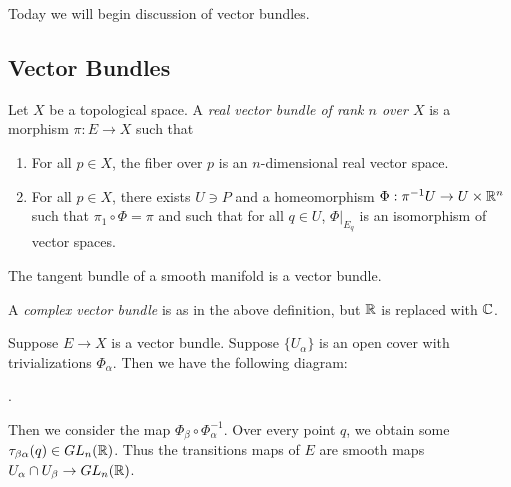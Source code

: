 \documentclass[twoside, 10pt]{article}
\begin{document}
    Today we will begin discussion of vector bundles.

    \subsection{Vector Bundles}%
    
    \begin{defn} Let $X$ be a topological space. A \textit{real vector bundle
        of rank $n$ over $X$} is a morphism $\pi:E \to X$ such that
        \begin{enumerate} \item For all $p \in X$, the fiber over $p$ is an
            $n$-dimensional real vector space.  \item For all $p \in X$, there
            exists $U \ni P$ and a homeomorphism $\Phi:\pi^{-1}U \to U \times
            \mathbb{R}^n$ such that $\pi_1 \circ \Phi = \pi$ and such that for all $q
            \in U$, $\Phi|_{E_q}$ is an isomorphism of vector spaces.
    \end{enumerate} \end{defn}

    \begin{exm} The tangent bundle of a smooth manifold is a vector bundle.
    \end{exm}

    \begin{defn} A \textit{complex vector bundle} is as in the above
    definition, but $\mathbb{R}$ is replaced with $\mathbb{C}$.  \end{defn}

    Suppose $E \to X$ is a vector bundle. Suppose $\{U_{\alpha}\}$ is an open
    cover with trivializations $\Phi_{\alpha}$. Then we have the following
    diagram: \begin{center} .  \end{center}

    Then we consider the map $\Phi_{\beta}\circ\Phi_{\alpha}^{-1}$. Over every
    point $q$, we obtain some $\tau_{\beta\alpha}(q) \in GL_n(\mathbb{R})$. Thus the
    transitions maps of $E$ are smooth maps $U_{\alpha} \cap U_{\beta} \to
    GL_n(\mathbb{R})$.
\end{document}
